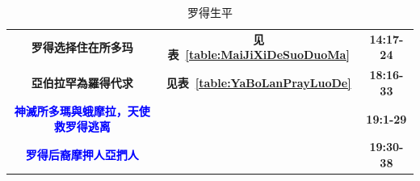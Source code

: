 \begin{table}[!hbp]
\begin{threeparttable}
\begin{tabular}{c c c}
\multicolumn{1}{L{\dimexpr0.5\linewidth-1\tabcolsep\relax}}{\bfseries 罗得选择住在所多玛} 
& \multicolumn{1}{L{\dimexpr0.1\linewidth-1\tabcolsep\relax}}{\bfseries 见表~\ref{table:MaiJiXiDeSuoDuoMa} }  
& \multicolumn{1}{L{\dimexpr0.1\linewidth-1\tabcolsep\relax}}{\bfseries 14:17-24}\\

\multicolumn{1}{L{\dimexpr0.5\linewidth-1\tabcolsep\relax}}{\bfseries 亞伯拉罕為羅得代求}  
& \multicolumn{1}{L{\dimexpr0.1\linewidth-1\tabcolsep\relax}}{\bfseries 见表~\ref{table:YaBoLanPrayLuoDe}} 
& \multicolumn{1}{L{\dimexpr0.1\linewidth-1\tabcolsep\relax}}{\bfseries 18:16-33}\\

\multicolumn{1}{L{\dimexpr0.5\linewidth-1\tabcolsep\relax}}{\bfseries \textcolor{blue}{神滅所多瑪與蛾摩拉，天使救罗得逃离}} 
& \multicolumn{1}{L{\dimexpr0.1\linewidth-1\tabcolsep\relax}}{\bfseries }  
& \multicolumn{1}{L{\dimexpr0.1\linewidth-1\tabcolsep\relax}}{\bfseries 19:1-29}\\

\multicolumn{1}{L{\dimexpr0.5\linewidth-1\tabcolsep\relax}}{\bfseries \textcolor{blue}{罗得后裔摩押人亞捫人}}  
& \multicolumn{1}{L{\dimexpr0.1\linewidth-1\tabcolsep\relax}}{\bfseries } 
& \multicolumn{1}{L{\dimexpr0.1\linewidth-1\tabcolsep\relax}}{\bfseries 19:30-38}\\\hline
\end{tabular}
\caption{罗得生平}
\label{table:LuoDeShengPing}
\end{threeparttable}
\end{table}

